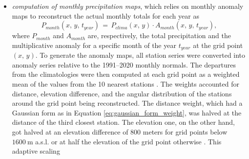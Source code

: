 \begin{itemize}[label=$\blacktriangleright$]
    \begin{equation}
        w_i^{par} \left(x,\,y\right)\,=\,\exp{-\frac{\left[\Delta_i^{par}\left(x,\,y\right)\right]^2}{c^{par}}},
        \label{eq:gaussian_form_weight}
    \end{equation}
    where $\Delta_i^{par}$ represents the difference in features between the selected station and the specific grid point, while $c^{par}$ controls the width of the 
    Gaussian. The $c^{par}$ parameters were locally optimized to maximize the agreement between estimated and observed normals. For each grid point, the 
    regression coefficients were estimated taking into account the \num{30} stations with the highest weights. Furthermore, to evaluate the robustness 
    of the estimates, the LWLR was performed \num{30} times removing a single station at each iteration. If the difference between the lowest and highest 
    estimates exceeded \num{30} \% of the weighted mean obtained using all 30 stations, the $c^{par}$ were relaxed by \num{10} \% to prevent individual 
    stations from dictating the normal values \parencite{precipitation_IHGAR}.
    \item \textit{computation of monthly precipitation maps}, which relies on monthly anomaly maps to reconstruct the actual monthly totals for each year 
    as 
    \begin{equation}
        P_{month}\left(x,\,y,\,t_{year}\right)\,=\,P_{clima}\left(x,\,y\right) \cdot A_{month}\left(x,\,y,\,t_{year}\right),
        \label{eq:monthly_precipitation_gridding}
    \end{equation}
    where $ P_{month}$ and $A_{month}$ are, respectively, the total precipitation and the multiplicative anomaly for a specific month of the year $t_{year}$ 
    at the grid point $\left(x,\,y\right)$. To generate the anomaly maps, all station series were converted into anomaly series relative to the 1991--2020 
    monthly normals. The departures from the climatologies were then computed at each grid point as a weighted mean of the values from the \num{10} 
    nearest stations \parencite{precipitation_IHGAR}. The weights accounted for distance, elevation difference, and the angular distribution of the stations 
    around the grid point being reconstructed. The distance weight, which had a Gaussian form as in Equation \eqref{eq:gaussian_form_weight}, was halved at 
    the distance of the third closest station. The elevation one, on the other hand, got halved at an elevation difference of \num{800} meters for grid 
    points below $\SI{1600}{\meter}$ a.s.l. or at half the elevation of the grid point otherwise \parencite{precipitation_IHGAR}. This adaptive scaling 

\end{itemize}
